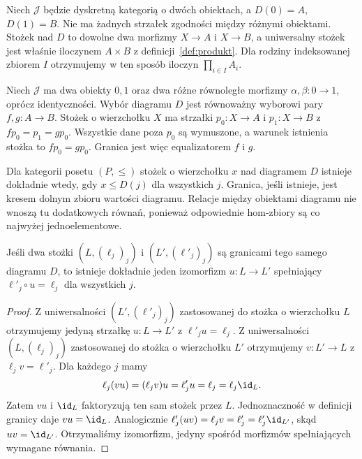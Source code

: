 \begin{przyklad}
Niech $\mathcal J$ będzie dyskretną kategorią o dwóch obiektach, a $D(0)=A$, $D(1)=B$. Nie ma żadnych strzałek zgodności między różnymi obiektami. Stożek nad $D$ to dowolne dwa morfizmy $X\to A$ i $X\to B$, a uniwersalny stożek jest właśnie iloczynem $A\times B$ z definicji~\ref{def:produkt}. Dla rodziny indeksowanej zbiorem $I$ otrzymujemy w ten sposób iloczyn $\prod_{i\in I}A_i$.
\end{przyklad}

\begin{przyklad}
Niech $\mathcal J$ ma dwa obiekty $0,1$ oraz dwa różne równoległe morfizmy $\alpha,\beta:0\to1$, oprócz identyczności. Wybór diagramu $D$ jest równoważny wyborowi pary $f,g:A\to B$. Stożek o wierzchołku $X$ ma strzałki $p_0:X\to A$ i $p_1:X\to B$ z $fp_0=p_1=gp_0$. Wszystkie dane poza $p_0$ są wymuszone, a warunek istnienia stożka to $fp_0=gp_0$. Granica jest więc equalizatorem $f$ i $g$.
\end{przyklad}

\begin{przyklad}
Dla kategorii posetu $(P,\leq)$ stożek o wierzchołku $x$ nad diagramem $D$ istnieje dokładnie wtedy, gdy $x\leq D(j)$ dla wszystkich $j$. Granica, jeśli istnieje, jest kresem dolnym zbioru wartości diagramu. Relacje między obiektami diagramu nie wnoszą tu dodatkowych równań, ponieważ odpowiednie hom-zbiory są co najwyżej jednoelementowe.
\end{przyklad}

\begin{twierdzenie}\label{tw:limit-unique}
Jeśli dwa stożki $(L,(\ell_j)_j)$ i $(L',(\ell'_j)_j)$ są granicami tego samego diagramu $D$, to istnieje dokładnie jeden izomorfizm $u:L\to L'$ spełniający $\ell'_j\circ u=\ell_j$ dla wszystkich $j$.
\end{twierdzenie}
\begin{proof}
Z uniwersalności $(L',(\ell'_j)_j)$ zastosowanej do stożka o wierzchołku $L$ otrzymujemy jedyną strzałkę $u:L\to L'$ z $\ell'_ju=\ell_j$. Z uniwersalności $(L,(\ell_j)_j)$ zastosowanej do stożka o wierzchołku $L'$ otrzymujemy $v:L'\to L$ z $\ell_jv=\ell'_j$. Dla każdego $j$ mamy
\[
\ell_j(vu)=(\ell_jv)u=\ell'_ju=\ell_j=\ell_j\id_L.
\]
Zatem $vu$ i $\id_L$ faktoryzują ten sam stożek przez $L$. Jednoznaczność w definicji granicy daje $vu=\id_L$. Analogicznie
$\ell'_j(uv)=\ell_jv=\ell'_j=\ell'_j\id_{L'}$, skąd $uv=\id_{L'}$. Otrzymaliśmy izomorfizm, jedyny spośród morfizmów spełniających wymagane równania.
\end{proof}



